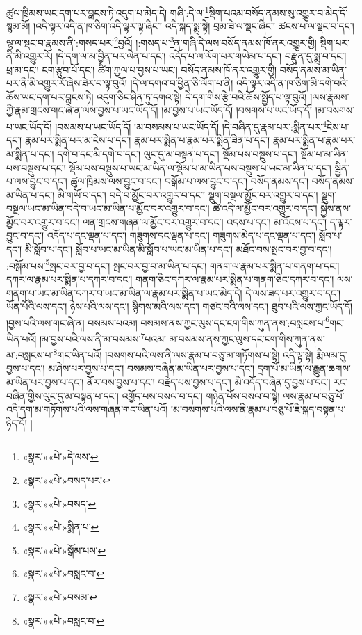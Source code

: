 ཚུལ་ཁྲིམས་ཡང་དག་པར་བླངས་ཏེ་འདུག་པ་མེད་དེ། གཞི་:དེ་ལ་\footnote{«སྣར་»«པེ་»དེ་ལས་}སྡིག་པའམ་བསོད་ནམས་སུ་འགྱུར་བ་མེད་དོ་སྙམ་མོ། །འདི་ལྟར་འདི་ན་ཁ་ཅིག་འདི་ལྟར་ལྟ་ཞིང་། འདི་སྐད་སྨྲ་སྟེ། བྲམ་ཟེ་ལ་སྡང་ཞིང་། ཚངས་པ་ལ་སྡང་བ་དང་། ལྷ་ལ་སྡང་བ་རྣམས་ནི་:གསད་པར་\footnote{«སྣར་»«པེ་»བསད་པར་}བྱའོ། །:གསད་པ་\footnote{«སྣར་»«པེ་»བསད་}ན་གཞི་དེ་ལས་བསོད་ནམས་ཁོ་ནར་འགྱུར་གྱི། སྡིག་པར་ནི་མི་འགྱུར་རོ། །དེ་དག་ལ་མ་བྱིན་པར་ལེན་པ་དང་། འདོད་པ་ལ་ལོག་པར་གཡེམ་པ་དང་། བརྫུན་དུ་སྨྲ་བ་དང་། ཕྲ་མ་དང་། ངག་རྩུབ་པོ་དང་། ཚིག་ཀྱལ་པ་བྱས་པ་ཡང་། བསོད་ནམས་ཁོ་ནར་འགྱུར་གྱི། བསོད་ནམས་མ་ཡིན་པར་ནི་མི་འགྱུར་རོ་ཞེས་ཟེར་བ་ལྟ་བུའོ། །དེ་ལ་དགའ་བ་ཕྱིན་ཅི་ལོག་པ་ནི། འདི་ལྟར་འདི་ན་ཁ་ཅིག་མི་དགེ་བའི་ཆོས་ཡང་དག་པར་བླངས་ཏེ། འདུག་ཅིང་ཤིན་ཏུ་དགའ་སྟེ། དེ་དག་གིས་རྩེ་བའི་ཆོས་སྤྱོད་པ་ལྟ་བུའོ། །ལས་རྣམས་ཀྱི་རྣམ་གྲངས་གང་ཞེ་ན་ལས་བྱས་པ་ཡང་ཡོད་དོ། །མ་བྱས་པ་ཡང་ཡོད་དོ། །བསགས་པ་ཡང་ཡོད་དོ། །མ་བསགས་པ་ཡང་ཡོད་དོ། །བསམས་པ་ཡང་ཡོད་དོ། །མ་བསམས་པ་ཡང་ཡོད་དོ། །དེ་བཞིན་དུ་རྣམ་པར་:སྨིན་པར་\footnote{«སྣར་»«པེ་»སྨིན་པ་}ངེས་པ་དང་། རྣམ་པར་སྨིན་པར་མ་ངེས་པ་དང་། རྣམ་པར་སྨིན་པ་རྣམ་པར་སྨིན་ཟིན་པ་དང་། རྣམ་པར་སྨིན་པ་རྣམ་པར་མ་སྨིན་པ་དང་། དགེ་བ་དང་མི་དགེ་བ་དང་། ལུང་དུ་མ་བསྟན་པ་དང་། སྡོམ་པས་བསྡུས་པ་དང་། སྡོམ་པ་མ་ཡིན་པས་བསྡུས་པ་དང་། སྡོམ་པས་བསྡུས་པ་ཡང་མ་ཡིན་ལ་སྡོམ་པ་མ་ཡིན་པས་བསྡུས་པ་ཡང་མ་ཡིན་པ་དང་། སྦྱིན་པ་ལས་བྱུང་བ་དང་། ཚུལ་ཁྲིམས་ལས་བྱུང་བ་དང་། བསྒོམ་པ་ལས་བྱུང་བ་དང་། བསོད་ནམས་དང་། བསོད་ནམས་མ་ཡིན་པ་དང་། མི་གཡོ་བ་དང་། བདེ་བ་མྱོང་བར་འགྱུར་བ་དང་། སྡུག་བསྔལ་མྱོང་བར་འགྱུར་བ་དང་། སྡུག་བསྔལ་ཡང་མ་ཡིན་བདེ་བ་ཡང་མ་ཡིན་པ་མྱོང་བར་འགྱུར་བ་དང་། ཚེ་འདི་ལ་མྱོང་བར་འགྱུར་བ་དང་། སྐྱེས་ནས་མྱོང་བར་འགྱུར་བ་དང་། ལན་གྲངས་གཞན་ལ་མྱོང་བར་འགྱུར་བ་དང་། འདས་པ་དང་། མ་འོངས་པ་དང་། ད་ལྟར་བྱུང་བ་དང་། འདོད་པ་དང་ལྡན་པ་དང་། གཟུགས་དང་ལྡན་པ་དང་། གཟུགས་མེད་པ་དང་ལྡན་པ་དང་། སློབ་པ་དང་། མི་སློབ་པ་དང་། སློབ་པ་ཡང་མ་ཡིན་མི་སློབ་པ་ཡང་མ་ཡིན་པ་དང་། མཐོང་བས་སྤང་བར་བྱ་བ་དང་། :བསྒོམ་པས་\footnote{«སྣར་»«པེ་»སྒོམ་པས་}སྤང་བར་བྱ་བ་དང་། སྤང་བར་བྱ་བ་མ་ཡིན་པ་དང་། གནག་ལ་རྣམ་པར་སྨིན་པ་གནག་པ་དང་། དཀར་ལ་རྣམ་པར་སྨིན་པ་དཀར་བ་དང་། གནག་ཅིང་དཀར་ལ་རྣམ་པར་སྨིན་པ་གནག་ཅིང་དཀར་བ་དང་། ལས་གནག་པ་ཡང་མ་ཡིན་དཀར་བ་ཡང་མ་ཡིན་ལ་རྣམ་པར་སྨིན་པ་ཡང་མེད་དེ། དེ་ལས་ཟད་པར་འགྱུར་བ་དང་། ཡོན་པོའི་ལས་དང་། ཉེས་པའི་ལས་དང་། སྙིགས་མའི་ལས་དང་། གཙང་བའི་ལས་དང་། ཐུབ་པའི་ལས་ཀྱང་ཡོད་དོ། །བྱས་པའི་ལས་གང་ཞེ་ན། བསམས་པའམ། བསམས་ནས་ཀྱང་ལུས་དང་ངག་གིས་ཀུན་ནས་:བསླངས་པ་\footnote{«སྣར་»«པེ་»བསླང་བ་}གང་ཡིན་པའོ། །མ་བྱས་པའི་ལས་ནི་མ་བསམས་\footnote{«སྣར་»«པེ་»བསམ་}པའམ། མ་བསམས་ནས་ཀྱང་ལུས་དང་ངག་གིས་ཀུན་ནས་མ་:བསླངས་པ་\footnote{«སྣར་»«པེ་»བསླང་བ་}གང་ཡིན་པའོ། །བསགས་པའི་ལས་ནི་ལས་རྣམ་པ་བཅུ་མ་གཏོགས་པ་སྟེ། འདི་ལྟ་སྟེ། རྨི་ལམ་དུ་བྱས་པ་དང་། མ་ཤེས་པར་བྱས་པ་དང་། བསམས་བཞིན་མ་ཡིན་པར་བྱས་པ་དང་། དྲག་པོ་མ་ཡིན་ལ་རྒྱུན་ཆགས་མ་ཡིན་པར་བྱས་པ་དང་། ནོར་བས་བྱས་པ་དང་། བརྗེད་པས་བྱས་པ་དང་། མི་འདོད་བཞིན་དུ་བྱས་པ་དང་། རང་བཞིན་གྱིས་ལུང་དུ་མ་བསྟན་པ་དང་། འགྱོད་པས་བསལ་བ་དང་། གཉེན་པོས་བསལ་བ་སྟེ། ལས་རྣམ་པ་བཅུ་པོ་འདི་དག་མ་གཏོགས་པའི་ལས་གཞན་གང་ཡིན་པའོ། །མ་བསགས་པའི་ལས་ནི་རྣམ་པ་བཅུ་པོ་ཇི་སྐད་བསྟན་པ་ཉིད་དོ། །
